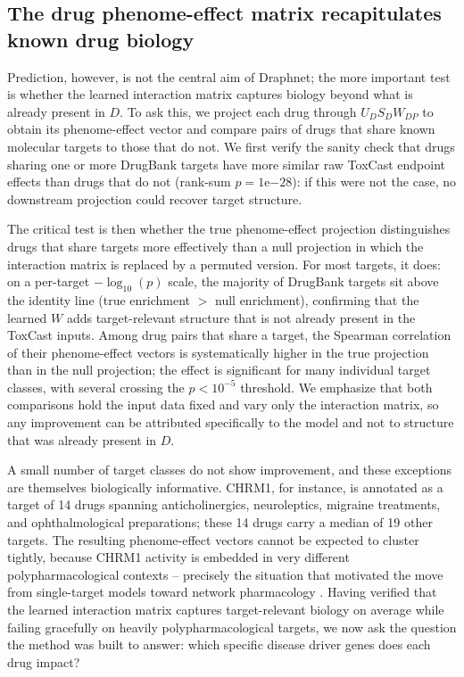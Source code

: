\documentclass[11pt]{article}
\begin{document}
\subsection{The drug phenome-effect matrix recapitulates known drug
biology}

Prediction, however, is not the central aim of Draphnet; the more
important test is whether the learned interaction matrix captures
biology beyond what is already present in $D$. To ask this, we project
each drug through $U_D S_D W_{DP}$ to obtain its phenome-effect vector
and compare pairs of drugs that share known molecular targets to those
that do not. We first verify the sanity check that drugs sharing one or
more DrugBank targets have more similar raw ToxCast endpoint effects
than drugs that do not (rank-sum $p=1\mathrm{e}{-28}$): if this were
not the case, no downstream projection could recover target structure.

The critical test is then whether the true phenome-effect projection
distinguishes drugs that share targets more effectively than a null
projection in which the interaction matrix is replaced by a permuted
version. For most targets, it does: on a per-target $-\log_{10}(p)$
scale, the majority of DrugBank targets sit above the identity line
(true enrichment $>$ null enrichment), confirming that the learned $W$
adds target-relevant structure that is not already present in the
ToxCast inputs. Among drug pairs that share a target, the Spearman
correlation of their phenome-effect vectors is systematically higher in
the true projection than in the null projection; the effect is
significant for many individual target classes, with several crossing
the $p<10^{-5}$ threshold. We emphasize that both comparisons hold the
input data fixed and vary only the interaction matrix, so any
improvement can be attributed specifically to the model and not to
structure that was already present in $D$.

A small number of target classes do not show improvement, and these
exceptions are themselves biologically informative. CHRM1, for
instance, is annotated as a target of 14 drugs spanning
anticholinergics, neuroleptics, migraine treatments, and ophthalmological
preparations; these 14 drugs carry a median of 19 other targets. The
resulting phenome-effect vectors cannot be expected to cluster
tightly, because CHRM1 activity is embedded in very different
polypharmacological contexts -- precisely the situation that motivated
the move from single-target models toward network pharmacology
\citep{hopkins2008network}. Having verified that the learned
interaction matrix captures target-relevant biology on average while
failing gracefully on heavily polypharmacological targets, we now ask
the question the method was built to answer: which specific disease
driver genes does each drug impact?
\end{document}
